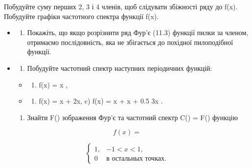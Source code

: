\documentclass[
  ukrainian,
]{article}
\providecommand{\tightlist}{%
  \setlength{\itemsep}{0pt}\setlength{\parskip}{0pt}}
\begin{document}
Побудуйте суму перших 2, 3 і 4 членів, щоб слідувати збіжності ряду до
f(x). Побудуйте графіки частотного спектра функції f(x).

\begin{itemize}
\item
  \begin{enumerate}
  \def\labelenumi{\arabic{enumi}.}
  \setcounter{enumi}{1}
  \tightlist
  \item
    Покажіть, що якщо розрізнити ряд Фур'є (11.3) функції пилки за
    членом, отримаємо послідовність, яка не збігається до похідної
    пилоподібної функції.
  \end{enumerate}
\item
  \begin{enumerate}
  \def\labelenumi{\arabic{enumi}.}
  \setcounter{enumi}{2}
  \tightlist
  \item
    Побудуйте частотний спектр наступних періодичних функцій:
  \end{enumerate}

  \begin{itemize}
  \tightlist
  \item
    \begin{enumerate}
    \def\labelenumi{\alph{enumi})}
    \tightlist
    \item
      f(x) = \sin x ,
    \end{enumerate}
  \item
    \begin{enumerate}
    \def\labelenumi{\arabic{enumi})}
    \setcounter{enumi}{5}
    \tightlist
    \item
      f(x) = \sin x + \cos 2x, c) f(x) = \sin x + \cos x + 0.5 \sin 3x .
    \end{enumerate}
  \end{itemize}

  \begin{enumerate}
  \def\labelenumi{\arabic{enumi}.}
  \setcounter{enumi}{3}
  \tightlist
  \item
    Знайти F(\xi) зображення Фур'є та частотний спектр C(\xi) =
    \textbar F(\xi)\textbar{} функцію
  \end{enumerate}
\end{itemize}

\[
f(x) =
\]

\[
\begin{cases} 1, & -1 < x < 1, \\ 0 & \text{в остальных точках.} \end{cases}
\]
\end{document}
